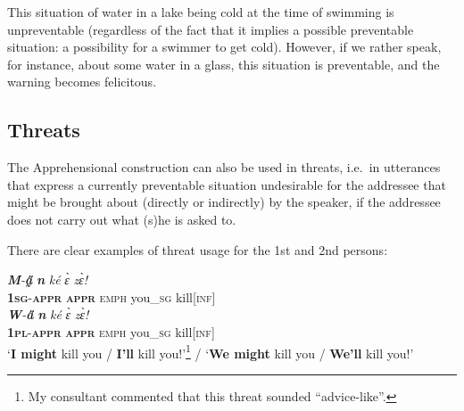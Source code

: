 \documentclass[output=paper,colorlinks,citecolor=brown]{langscibook}
\begin{document}
\noindent This situation of water in a lake being cold at the time of swimming is unpreventable (regardless of the fact that it implies a possible preventable situation: a possibility for a swimmer to get cold). However, if we rather speak, for instance, about some water in a glass, this situation is preventable, and the warning becomes felicitous.


\subsection{Threats}
\label{subsec:threats}

The Apprehensional construction can also be used in threats, i.e.\ in utterances that express a currently preventable situation undesirable for the addressee that might be brought about (directly or indirectly) by the speaker, if the addressee does not carry out what (s)he is asked to.

There are clear examples of threat usage for the 1st and 2nd persons:

\z



\ea \label{ex:Fed32}
\ea \label{ex:Fed32a}
\gll \textit{\textbf{M}-\textbf{a̰̋}} \textit{\textbf{n{\ù}}} \textit{ké} \textit{ɛ̀} \textit{zɛ̀!} \\
\textsc{\textbf{1sg}-\textbf{appr}} \textsc{\textbf{appr}} \textsc{emph} you\_\textsc{sg} kill\textsc{[inf]} \\
\ex \label{ex:Fed32b}
\gll \textit{\textbf{W}-\textbf{a̋}} \textit{\textbf{n{\ù}}} \textit{ké} \textit{ɛ̀} \textit{zɛ̀!} \\
\textsc{\textbf{1pl}-\textbf{appr}} \textsc{\textbf{appr}} \textsc{emph} you\_\textsc{sg} kill\textsc{[inf]} \\
 `\textbf{I might} kill you / \textbf{I'll} kill you!'\footnote{My consultant commented that this threat sounded ``advice-like''.} / `\textbf{We might} kill you / \textbf{We'll} kill you!'
\z
\z
\end{document}
